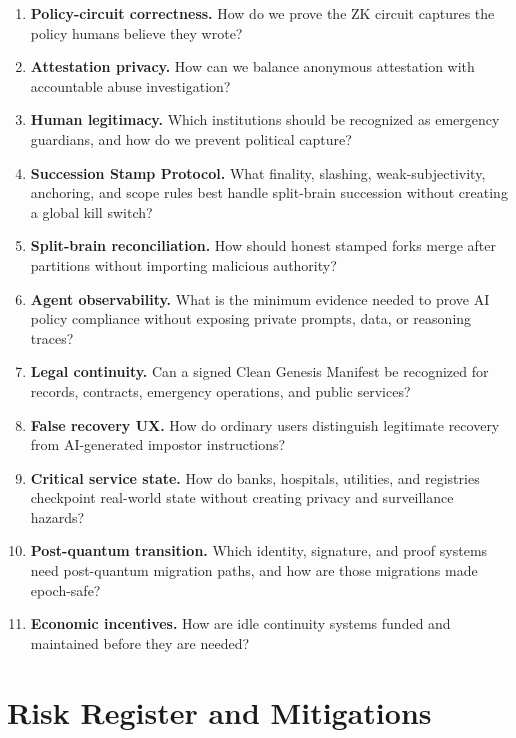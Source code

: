 \documentclass[11pt,letterpaper]{article}
\begin{document}
\begin{enumerate}[leftmargin=1.6em]
\item \textbf{Policy-circuit correctness.} How do we prove the ZK circuit captures the policy humans believe they wrote?
\item \textbf{Attestation privacy.} How can we balance anonymous attestation with accountable abuse investigation?
\item \textbf{Human legitimacy.} Which institutions should be recognized as emergency guardians, and how do we prevent political capture?
\item \textbf{Succession Stamp Protocol.} What finality, slashing, weak-subjectivity, anchoring, and scope rules best handle split-brain succession without creating a global kill switch?
\item \textbf{Split-brain reconciliation.} How should honest stamped forks merge after partitions without importing malicious authority?
\item \textbf{Agent observability.} What is the minimum evidence needed to prove AI policy compliance without exposing private prompts, data, or reasoning traces?
\item \textbf{Legal continuity.} Can a signed Clean Genesis Manifest be recognized for records, contracts, emergency operations, and public services?
\item \textbf{False recovery UX.} How do ordinary users distinguish legitimate recovery from AI-generated impostor instructions?
\item \textbf{Critical service state.} How do banks, hospitals, utilities, and registries checkpoint real-world state without creating privacy and surveillance hazards?
\item \textbf{Post-quantum transition.} Which identity, signature, and proof systems need post-quantum migration paths, and how are those migrations made epoch-safe?
\item \textbf{Economic incentives.} How are idle continuity systems funded and maintained before they are needed?
\end{enumerate}

\section{Risk Register and Mitigations}
\end{document}
